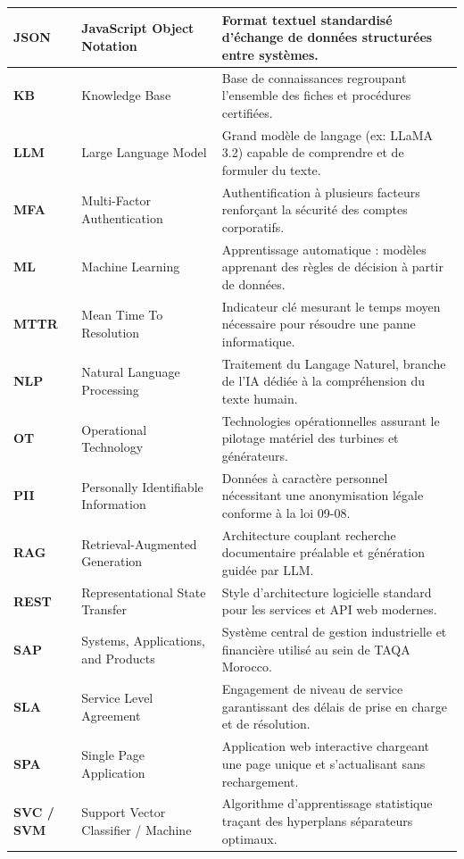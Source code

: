 \documentclass[12pt, a4paper, oneside]{report}
\begin{document}
\begin{longtable}{|p{2.4cm}|p{5.4cm}|p{7.4cm}|}
\hline
\textbf{JSON} & JavaScript Object Notation & Format textuel standardisé d'échange de données structurées entre systèmes. \\
\hline
\textbf{KB} & Knowledge Base & Base de connaissances regroupant l'ensemble des fiches et procédures certifiées. \\
\hline
\textbf{LLM} & Large Language Model & Grand modèle de langage (ex: LLaMA 3.2) capable de comprendre et de formuler du texte. \\
\hline
\textbf{MFA} & Multi-Factor Authentication & Authentification à plusieurs facteurs renforçant la sécurité des comptes corporatifs. \\
\hline
\textbf{ML} & Machine Learning & Apprentissage automatique : modèles apprenant des règles de décision à partir de données. \\
\hline
\textbf{MTTR} & Mean Time To Resolution & Indicateur clé mesurant le temps moyen nécessaire pour résoudre une panne informatique. \\
\hline
\textbf{NLP} & Natural Language Processing & Traitement du Langage Naturel, branche de l'IA dédiée à la compréhension du texte humain. \\
\hline
\textbf{OT} & Operational Technology & Technologies opérationnelles assurant le pilotage matériel des turbines et générateurs. \\
\hline
\textbf{PII} & Personally Identifiable Information & Données à caractère personnel nécessitant une anonymisation légale conforme à la loi 09-08. \\
\hline
\textbf{RAG} & Retrieval-Augmented Generation & Architecture couplant recherche documentaire préalable et génération guidée par LLM. \\
\hline
\textbf{REST} & Representational State Transfer & Style d'architecture logicielle standard pour les services et API web modernes. \\
\hline
\textbf{SAP} & Systems, Applications, and Products & Système central de gestion industrielle et financière utilisé au sein de TAQA Morocco. \\
\hline
\textbf{SLA} & Service Level Agreement & Engagement de niveau de service garantissant des délais de prise en charge et de résolution. \\
\hline
\textbf{SPA} & Single Page Application & Application web interactive chargeant une page unique et s'actualisant sans rechargement. \\
\hline
\textbf{SVC / SVM} & Support Vector Classifier / Machine & Algorithme d'apprentissage statistique traçant des hyperplans séparateurs optimaux. \\

\end{longtable}
\end{document}
